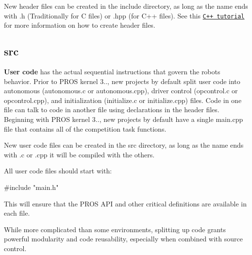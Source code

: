 New header files can be created in the include directory, as long as the name ends with {\ttfamily .h} (Traditionally for C files) or {\ttfamily .hpp} (for C++ files). See this \href{http://www.learncpp.com/cpp-tutorial/19-header-files/}{\tt C++ tutorial} for more information on how to create header files.

\subsection*{src}

{\bfseries User code} has the actual sequential instructions that govern the robot\textquotesingle{}s behavior. Prior to P\+R\+OS kernel 3.., new projects by default split user code into autonomous ({\ttfamily autonomous.\+c} or {\ttfamily autonomous.\+cpp}), driver control ({\ttfamily opcontrol.\+c} or {\ttfamily opcontrol.\+cpp}), and initialization ({\ttfamily initialize.\+c} or {\ttfamily initialize.\+cpp}) files. Code in one file can talk to code in another file using declarations in the header files. Beginning with P\+R\+OS kernel 3.., new projects by default have a single {\ttfamily main.\+cpp} file that contains all of the competition task functions.

New user code files can be created in the {\ttfamily src} directory, as long as the name ends with {\ttfamily .c} or {\ttfamily .cpp} it will be compiled with the others.

All user code files should start with\+: \begin{DoxyVerb}#include "main.h"
\end{DoxyVerb}


This will ensure that the P\+R\+OS A\+PI and other critical definitions are available in each file.

While more complicated than some environments, splitting up code grants powerful modularity and code reusability, especially when combined with source control. 